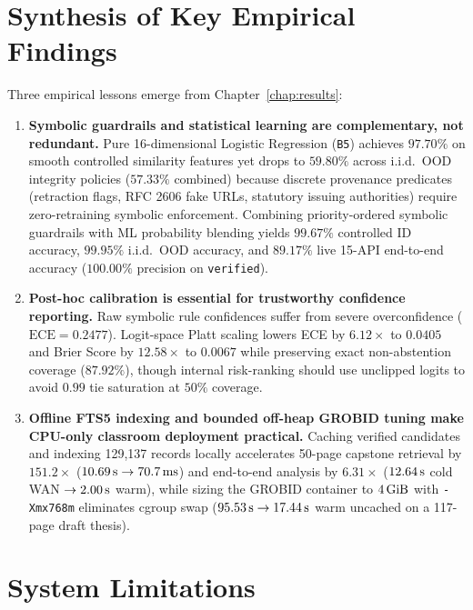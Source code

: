 \section{Synthesis of Key Empirical Findings}

Three empirical lessons emerge from Chapter~\ref{chap:results}:
{\setlength{\itemsep}{1pt}
\begin{enumerate}
    \item \textbf{Symbolic guardrails and statistical learning are complementary, not redundant.} Pure 16-dimensional Logistic Regression (\texttt{B5}) achieves $97.70\%$ on smooth controlled similarity features yet drops to $59.80\%$ across i.i.d.\ OOD integrity policies ($57.33\%$ combined) because discrete provenance predicates (retraction flags, RFC 2606 fake URLs, statutory issuing authorities) require zero-retraining symbolic enforcement. Combining priority-ordered symbolic guardrails with ML probability blending yields $99.67\%$ controlled ID accuracy, $99.95\%$ i.i.d.\ OOD accuracy, and $89.17\%$ live 15-API end-to-end accuracy ($100.00\%$ precision on \texttt{verified}).
    \item \textbf{Post-hoc calibration is essential for trustworthy confidence reporting.} Raw symbolic rule confidences suffer from severe overconfidence ($\text{ECE} = 0.2477$). Logit-space Platt scaling lowers ECE by $6.12\times$ to $0.0405$ and Brier Score by $12.58\times$ to $0.0067$ while preserving exact non-abstention coverage ($87.92\%$), though internal risk-ranking should use unclipped logits to avoid $0.99$ tie saturation at $50\%$ coverage.
    \item \textbf{Offline FTS5 indexing and bounded off-heap GROBID tuning make CPU-only classroom deployment practical.} Caching verified candidates and indexing 129,137 records locally accelerates 50-page capstone retrieval by $151.2\times$ ($10.69\text{\,s} \rightarrow 70.7\text{\,ms}$) and end-to-end analysis by $6.31\times$ ($12.64\text{\,s}$ cold WAN $\rightarrow 2.00\text{\,s}$ warm), while sizing the GROBID container to $4\text{\,GiB}$ with \texttt{-Xmx768m} eliminates cgroup swap ($95.53\text{\,s} \rightarrow 17.44\text{\,s}$ warm uncached on a 117-page draft thesis).
\end{enumerate}}

\section{System Limitations}
\label{sec:limitations}

